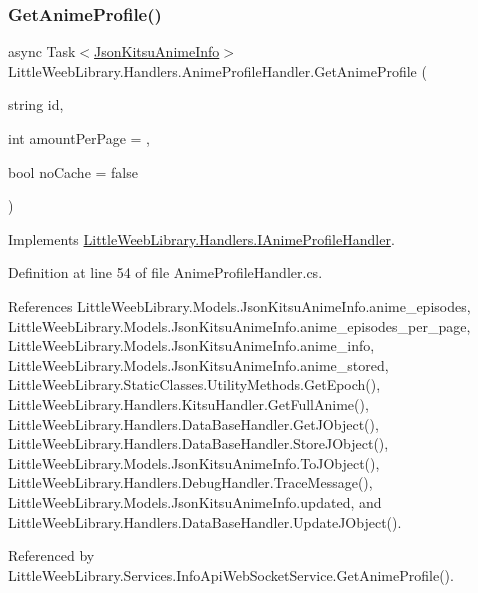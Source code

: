 \subsubsection{\texorpdfstring{Get\+Anime\+Profile()}{GetAnimeProfile()}}
{\footnotesize\ttfamily async Task$<$\mbox{\hyperlink{class_little_weeb_library_1_1_models_1_1_json_kitsu_anime_info}{Json\+Kitsu\+Anime\+Info}}$>$ Little\+Weeb\+Library.\+Handlers.\+Anime\+Profile\+Handler.\+Get\+Anime\+Profile (\begin{DoxyParamCaption}\item[{string}]{id,  }\item[{int}]{amount\+Per\+Page = {},  }\item[{bool}]{no\+Cache = {\ttfamily false} }\end{DoxyParamCaption})}



Implements \mbox{\hyperlink{interface_little_weeb_library_1_1_handlers_1_1_i_anime_profile_handler_ad0fbcf84372d9d564e8d84d3291fa136}{Little\+Weeb\+Library.\+Handlers.\+I\+Anime\+Profile\+Handler}}.



Definition at line 54 of file Anime\+Profile\+Handler.\+cs.



References Little\+Weeb\+Library.\+Models.\+Json\+Kitsu\+Anime\+Info.\+anime\+\_\+episodes, Little\+Weeb\+Library.\+Models.\+Json\+Kitsu\+Anime\+Info.\+anime\+\_\+episodes\+\_\+per\+\_\+page, Little\+Weeb\+Library.\+Models.\+Json\+Kitsu\+Anime\+Info.\+anime\+\_\+info, Little\+Weeb\+Library.\+Models.\+Json\+Kitsu\+Anime\+Info.\+anime\+\_\+stored, Little\+Weeb\+Library.\+Static\+Classes.\+Utility\+Methods.\+Get\+Epoch(), Little\+Weeb\+Library.\+Handlers.\+Kitsu\+Handler.\+Get\+Full\+Anime(), Little\+Weeb\+Library.\+Handlers.\+Data\+Base\+Handler.\+Get\+J\+Object(), Little\+Weeb\+Library.\+Handlers.\+Data\+Base\+Handler.\+Store\+J\+Object(), Little\+Weeb\+Library.\+Models.\+Json\+Kitsu\+Anime\+Info.\+To\+J\+Object(), Little\+Weeb\+Library.\+Handlers.\+Debug\+Handler.\+Trace\+Message(), Little\+Weeb\+Library.\+Models.\+Json\+Kitsu\+Anime\+Info.\+updated, and Little\+Weeb\+Library.\+Handlers.\+Data\+Base\+Handler.\+Update\+J\+Object().



Referenced by Little\+Weeb\+Library.\+Services.\+Info\+Api\+Web\+Socket\+Service.\+Get\+Anime\+Profile().


